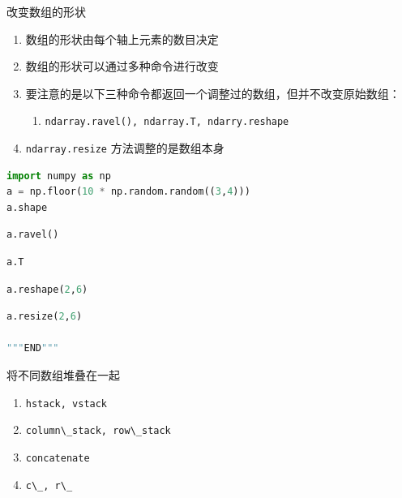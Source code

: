 \documentclass[ignorenonframetext,11pt,xcolor=dvipsnames,hyperref={colorlinks,allcolors=.,urlcolor=blue, citecolor=violet, bookmarksdepth=4},aspectratio=1610]{beamer}
\providecommand{\tightlist}{%
  \setlength{\itemsep}{0pt}\setlength{\parskip}{0pt}}
\newcommand{\passthrough}[1]{#1}
\begin{document}
\begin{frame}[fragile]{改变数组的形状}
\protect\hypertarget{section-16}{}

\begin{enumerate}
\tightlist
\item
  数组的形状由每个轴上元素的数目决定
\item
  数组的形状可以通过多种命令进行改变
\item
  要注意的是以下三种命令都返回一个调整过的数组，但并不改变原始数组：

  \begin{enumerate}
  \tightlist
  \item
    \passthrough{\lstinline!ndarray.ravel(), ndarray.T, ndarry.reshape!}
  \end{enumerate}
\item
  \passthrough{\lstinline!ndarray.resize!} 方法调整的是数组本身
\end{enumerate}

\begin{lstlisting}[language=Python]
import numpy as np
a = np.floor(10 * np.random.random((3,4)))
a.shape
\end{lstlisting}

\begin{lstlisting}[language=Python]
a.ravel()
\end{lstlisting}

\begin{lstlisting}[language=Python]
a.T
\end{lstlisting}

\begin{lstlisting}[language=Python]
a.reshape(2,6)
\end{lstlisting}

\begin{lstlisting}[language=Python]
a.resize(2,6)

"""END"""
\end{lstlisting}

\end{frame}

\begin{frame}[fragile]{将不同数组堆叠在一起}
\protect\hypertarget{section-17}{}

\begin{enumerate}
\tightlist
\item
  \passthrough{\lstinline!hstack, vstack!}
\item
  \passthrough{\lstinline!column\_stack, row\_stack!}
\item
  \passthrough{\lstinline!concatenate!}
\item
  \passthrough{\lstinline!c\_, r\_!}
\end{enumerate}

\end{frame}
\end{document}

